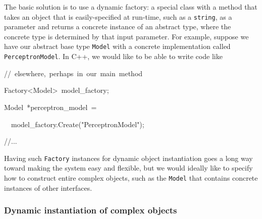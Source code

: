 \documentclass[a4paper]{article}
\let\textquotedbl="
\newenvironment{lyxcode}
{\par\begin{list}{}{
\scriptsize
\setlength{\leftmargin}{0.1in}
\setlength{\rightmargin}{\leftmargin}
\setlength{\listparindent}{0pt}%
\raggedright
\setlength{\itemsep}{0pt}
\setlength{\parsep}{0pt}
\normalfont\ttfamily}%
 \item[]}
{\end{list}}
\begin{document}
The basic solution is to use a dynamic factory: a special class with
a method that takes an object that is easily-specified at run-time,
such as a \texttt{string}, as a parameter and returns a concrete instance
of an abstract type, where the concrete type is determined by that
input parameter. For example, suppose we have our abstract base type
\texttt{Model} with a concrete implementation called \texttt{PerceptronModel}.
In C++, we would like to be able to write code like
\begin{lyxcode}
//~elsewhere,~perhaps~in~our~main~method

Factory<Model>~model\_factory;

Model~{*}perceptron\_model~=

~~model\_factory.Create(\textquotedbl{}PerceptronModel\textquotedbl{});

//...
\end{lyxcode}
Having such \texttt{Factory} instances for dynamic object instantiation
goes a long way toward making the system easy and flexible, but we
would ideally like to specify how to construct entire complex objects,
such as the \texttt{Model} that contains concrete instances of other
interfaces.


\subsubsection{Dynamic instantiation of complex objects}
\end{document}
